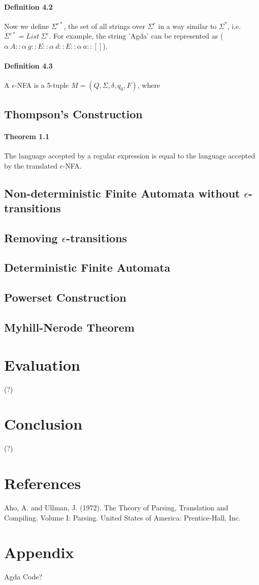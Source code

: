\documentclass[twoside,openright,final]{bhamthesis}
\begin{document}
\paragraph{Definition 4.2} Now we define \(\Sigma^{e*}\), the set of all strings over
\(\Sigma^e\) in a way similar to \(\Sigma^*\), i.e. \(\Sigma^{e*} =
List\ \Sigma^e\). For example, the string 'Agda' can be
represented as (\(\alpha\ A :: \alpha\ g :: E :: \alpha\ d :: E :: \alpha\
a :: []\)). 

\paragraph{Definition 4.3} A \(\epsilon\)-NFA is a 5-tuple \(M = (Q ,
\Sigma, \delta, q_0, F)\), where

\subsection{Thompson's Construction}

\paragraph{Theorem 1.1} The language accepted by a regular expression
is equal to the language accepted by the translated \(\epsilon\)-NFA. 

\subsection{Non-deterministic Finite Automata without \(\epsilon\)-transitions}

\subsection{Removing \(\epsilon\)-transitions}

\subsection{Deterministic Finite Automata}

\subsection{Powerset Construction}

\subsection{Myhill-Nerode Theorem}

\section{Evaluation}
(?)

\section{Conclusion}
(?)

\section{References}
Aho, A. and Ullman, J. (1972). The Theory of Parsing, Translation and Compiling. Volume I: Parsing. United States of America: Prentice-Hall, Inc.

\section{Appendix}
Agda Code?
\end{document}
